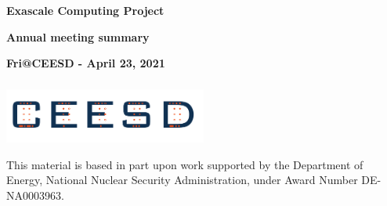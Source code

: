 \documentclass{beamer}
\begin{document}
\begin{frame}\frametitle{}
\vspace*{0.2in}
\centerline{\textrm{{\huge\bfseries\color{myOrange} Exascale Computing Project}}}
\smallskip
\centerline{\textrm{{\huge\bfseries\color{myOrange} Annual meeting summary}}}
\smallskip
\smallskip
\centerline{\textrm{{\large\bfseries{Fri@CEESD - April 23, 2021}}}}
\vspace*{0.2in}
\begin{center}
\vspace*{0.4in}
\end{center}
\end{frame}



\begin{frame}\frametitle{}
  \vspace*{0.2in}
  
\begin{center}
\includegraphics[width=0.5\textwidth]{ceesd-logo-2.pdf}\\

\vspace*{0.35in}

\vspace*{0.5in}
\begin{minipage}{0.8\textwidth}
This material is based in part upon work supported by the Department of Energy, National Nuclear Security Administration, under Award Number DE-NA0003963. 
\end{minipage}
\end{center}


\end{frame}
\end{document}
